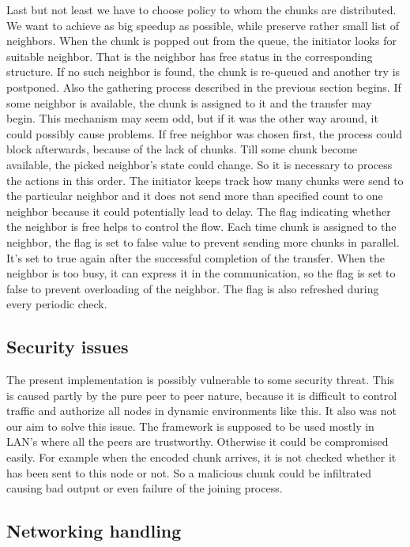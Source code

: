 Last but not least we have to choose policy to whom the chunks are
distributed. We want to achieve as big speedup as possible, while
preserve rather small list of neighbors. When the chunk is popped out
from the queue, the initiator looks for suitable neighbor. That is the
neighbor has free status in the corresponding structure. If no such
neighbor is found, the chunk is re-queued and another try is postponed.
Also the gathering process described in the previous section begins. If
some neighbor is available, the chunk is assigned to it and the transfer
may begin. This mechanism may seem odd, but if it was the other way
around, it could possibly cause problems. If free neighbor was chosen
first, the process could block afterwards, because of the lack of
chunks. Till some chunk become available, the picked neighbor's state
could change. So it is necessary to process the actions in this order.
The initiator keeps track how many chunks were send to the particular
neighbor and it does not send more than specified count to one neighbor
because it could potentially lead to delay. The flag indicating whether
the neighbor is free helps to control the flow. Each time chunk is
assigned to the neighbor, the flag is set to false value to prevent
sending more chunks in parallel. It's set to true again after the
successful completion of the transfer. When the neighbor is too busy, it
can express it in the communication, so the flag is set to false to
prevent overloading of the neighbor. The flag is also refreshed during
every periodic check.

\subsection{Security issues}\label{security-issues}

The present implementation is possibly vulnerable to some security
threat. This is caused partly by the pure peer to peer nature, because
it is difficult to control traffic and authorize all nodes in dynamic
environments like this. It also was not our aim to solve this issue. The
framework is supposed to be used mostly in LAN's where all the peers are
trustworthy. Otherwise it could be compromised easily. For example when
the encoded chunk arrives, it is not checked whether it has been sent to
this node or not. So a malicious chunk could be infiltrated causing bad
output or even failure of the joining process.

\subsection{Networking handling}\label{networking-handling}

